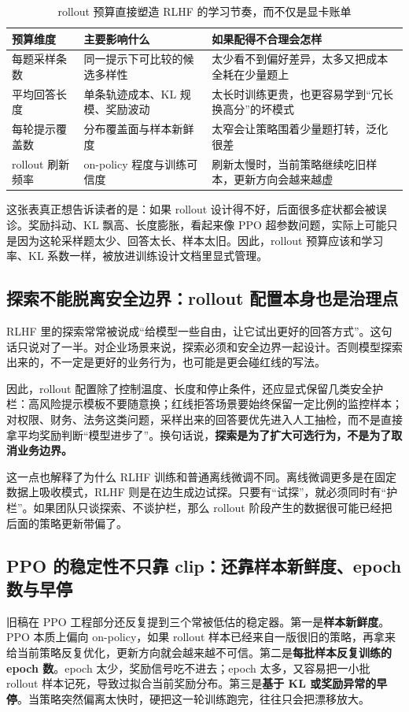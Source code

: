 \begin{table}[H]
\centering
\small
\begin{tabularx}{\textwidth}{>{\raggedright\arraybackslash}p{2.9cm}>{\raggedright\arraybackslash}p{3.1cm}>{\raggedright\arraybackslash}X}
\toprule
\textbf{预算维度} & \textbf{主要影响什么} & \textbf{如果配得不合理会怎样} \\
\midrule
每题采样条数 & 同一提示下可比较的候选多样性 & 太少看不到偏好差异，太多又把成本全耗在少量题上 \\
平均回答长度 & 单条轨迹成本、KL 规模、奖励波动 & 太长时训练更贵，也更容易学到“冗长换高分”的坏模式 \\
每轮提示覆盖数 & 分布覆盖面与样本新鲜度 & 太窄会让策略围着少量题打转，泛化很差 \\
rollout 刷新频率 & on-policy 程度与训练可信度 & 刷新太慢时，当前策略继续吃旧样本，更新方向会越来越虚 \\
\bottomrule
\end{tabularx}
\caption{rollout 预算直接塑造 RLHF 的学习节奏，而不仅是显卡账单}
\label{tab:rollout-budget}
\end{table}

这张表真正想告诉读者的是：如果 rollout 设计得不好，后面很多症状都会被误诊。奖励抖动、KL 飘高、长度膨胀，看起来像 PPO 超参数问题，实际上可能只是因为这轮采样题太少、回答太长、样本太旧。因此，rollout 预算应该和学习率、KL 系数一样，被放进训练设计文档里显式管理。

\subsection{探索不能脱离安全边界：rollout 配置本身也是治理点}
RLHF 里的探索常常被说成“给模型一些自由，让它试出更好的回答方式”。这句话只说对了一半。对企业场景来说，探索必须和安全边界一起设计。否则模型探索出来的，不一定是更好的业务行为，也可能是更会碰红线的写法。

因此，rollout 配置除了控制温度、长度和停止条件，还应显式保留几类安全护栏：高风险提示模板不要随意换；红线拒答场景要始终保留一定比例的监控样本；对权限、财务、法务这类问题，采样出来的回答要优先进入人工抽检，而不是直接拿平均奖励判断“模型进步了”。换句话说，\textbf{探索是为了扩大可选行为，不是为了取消业务边界。}

这一点也解释了为什么 RLHF 训练和普通离线微调不同。离线微调更多是在固定数据上吸收模式，RLHF 则是在边生成边试探。只要有“试探”，就必须同时有“护栏”。如果团队只谈探索、不谈护栏，那么 rollout 阶段产生的数据很可能已经把后面的策略更新带偏了。

\subsection{PPO 的稳定性不只靠 clip：还靠样本新鲜度、epoch 数与早停}
旧稿在 PPO 工程部分还反复提到三个常被低估的稳定器。第一是\textbf{样本新鲜度}。PPO 本质上偏向 on-policy，如果 rollout 样本已经来自一版很旧的策略，再拿来给当前策略反复优化，更新方向就会越来越不可信。第二是\textbf{每批样本反复训练的 epoch 数}。epoch 太少，奖励信号吃不进去；epoch 太多，又容易把一小批 rollout 样本记死，导致过拟合当前奖励分布。第三是\textbf{基于 KL 或奖励异常的早停}。当策略突然偏离太快时，硬把这一轮训练跑完，往往只会把漂移放大。

